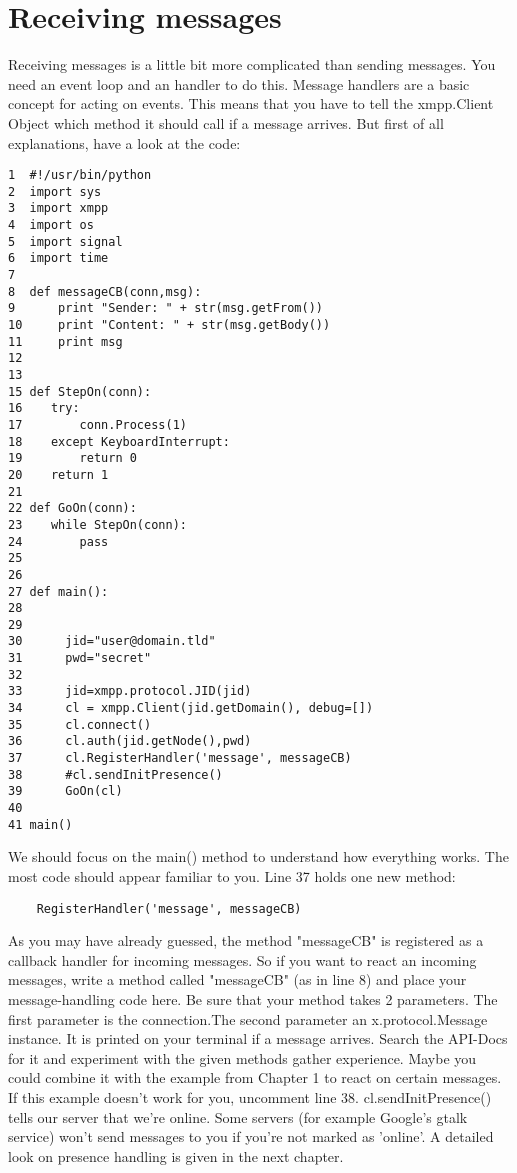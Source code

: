 \section{Receiving messages}

Receiving messages is a little bit more complicated than sending messages. You need an event loop and an handler to do this.
\newline
Message handlers are a basic concept for acting on events. This means that you have to tell the xmpp.Client Object which method it should call if a message arrives. But first of all explanations, have a look at the code:
\newline
\newline
\begin{verbatim}
1  #!/usr/bin/python
2  import sys
3  import xmpp
4  import os
5  import signal
6  import time
7
8  def messageCB(conn,msg):
9      print "Sender: " + str(msg.getFrom())
10     print "Content: " + str(msg.getBody())
11     print msg
12
13
15 def StepOn(conn):
16    try:
17        conn.Process(1)
18    except KeyboardInterrupt:
19        return 0
20    return 1
21
22 def GoOn(conn):
23    while StepOn(conn):
24        pass
25
26
27 def main():
28
29
30      jid="user@domain.tld"
31      pwd="secret"
32
33      jid=xmpp.protocol.JID(jid)
34      cl = xmpp.Client(jid.getDomain(), debug=[])
35      cl.connect()
36      cl.auth(jid.getNode(),pwd)
37      cl.RegisterHandler('message', messageCB)
38      #cl.sendInitPresence()
39      GoOn(cl)
40
41 main()
\end{verbatim}
We should focus on the main() method to understand how everything works. The most code should appear familiar to you. Line 37 holds one new method: \begin{verbatim}	RegisterHandler('message', messageCB)\end{verbatim}
As you may have already guessed, the method "messageCB" is registered as a callback handler for incoming messages. So if you want to react an incoming messages, write a method called "messageCB" (as in line 8)
and place your message-handling code here. Be sure that your method takes 2 parameters.
The first parameter is the connection.The second parameter an x.protocol.Message instance. It is printed on your terminal if a message arrives. Search the API-Docs for it and experiment with the given methods gather experience. Maybe you could combine it with the example from Chapter 1 to react on certain messages.
\newline
\newline
If this example doesn't work for you, uncomment line 38. cl.sendInitPresence() tells our server that we're online. Some servers (for example Google's gtalk service) won't send messages to you if you're not marked as 'online'. A detailed look on presence handling is given in the next chapter.


